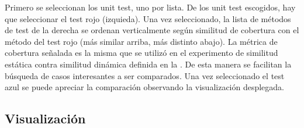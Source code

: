 
\par Primero se seleccionan los unit test, uno por lista. De los unit test escogidos, hay que seleccionar el test rojo (izquieda). Una vez seleccionado, la lista de métodos de test de la derecha se ordenan verticalmente según similitud de cobertura con el método del test rojo (más similar arriba, más distinto abajo). La métrica de cobertura señalada es la misma que se utilizó en el experimento de similitud estática contra similitud dinámica definida en la . De esta manera se facilitan la búsqueda de casos interesantes a ser comparados. Una vez seleccionado el test azul se puede apreciar la comparación observando la visualización desplegada.

\subsection{Visualización}

